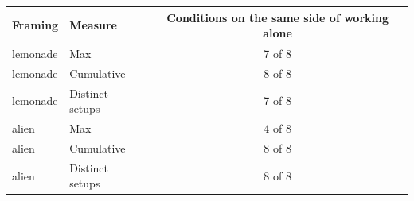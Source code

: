 \begin{tabular}{l l c}
\toprule
Framing & Measure & Conditions on the same side of working alone \\
\midrule
lemonade & Max & 7 of 8 \\
lemonade & Cumulative & 8 of 8 \\
lemonade & Distinct setups & 7 of 8 \\
alien & Max & 4 of 8 \\
alien & Cumulative & 8 of 8 \\
alien & Distinct setups & 8 of 8 \\
\bottomrule
\end{tabular}